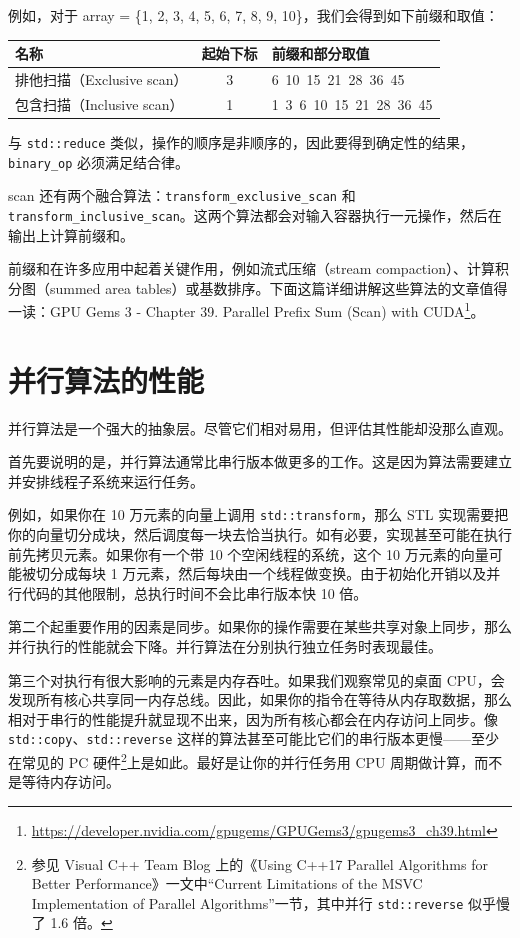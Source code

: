 例如，对于 array = \{1, 2, 3, 4, 5, 6, 7, 8, 9, 10\}，我们会得到如下前缀和取值：

\begin{table}[H]
\centering
\begin{tabularx}{\textwidth}{X c X}
\toprule
名称 & 起始下标 & 前缀和部分取值 \\
\midrule
排他扫描（Exclusive scan） & 3 & 6\ 10\ 15\ 21\ 28\ 36\ 45 \\
包含扫描（Inclusive scan） & 1 & 1\ 3\ 6\ 10\ 15\ 21\ 28\ 36\ 45 \\
\bottomrule
\end{tabularx}
\end{table}

与 \texttt{std::reduce} 类似，操作的顺序是非顺序的，因此要得到确定性的结果，\texttt{binary\_op} 必须满足结合律。

scan 还有两个融合算法：\texttt{transform\_exclusive\_scan} 和 \texttt{transform\_inclusive\_scan}。这两个算法都会对输入容器执行一元操作，然后在输出上计算前缀和。

前缀和在许多应用中起着关键作用，例如流式压缩（stream compaction）、计算积分图（summed area tables）或基数排序。下面这篇详细讲解这些算法的文章值得一读：GPU Gems 3 - Chapter 39. Parallel Prefix Sum (Scan) with CUDA\footnote{\url{https://developer.nvidia.com/gpugems/GPUGems3/gpugems3_ch39.html}}。


\section{并行算法的性能}

并行算法是一个强大的抽象层。尽管它们相对易用，但评估其性能却没那么直观。

首先要说明的是，并行算法通常比串行版本做更多的工作。这是因为算法需要建立并安排线程子系统来运行任务。

例如，如果你在 10 万元素的向量上调用 \texttt{std::transform}，那么 STL 实现需要把你的向量切分成块，然后调度每一块去恰当执行。如有必要，实现甚至可能在执行前先拷贝元素。如果你有一个带 10 个空闲线程的系统，这个 10 万元素的向量可能被切分成每块 1 万元素，然后每块由一个线程做变换。由于初始化开销以及并行代码的其他限制，总执行时间不会比串行版本快 10 倍。

第二个起重要作用的因素是同步。如果你的操作需要在某些共享对象上同步，那么并行执行的性能就会下降。并行算法在分别执行独立任务时表现最佳。

第三个对执行有很大影响的元素是内存吞吐。如果我们观察常见的桌面 CPU，会发现所有核心共享同一内存总线。因此，如果你的指令在等待从内存取数据，那么相对于串行的性能提升就显现不出来，因为所有核心都会在内存访问上同步。像 \texttt{std::copy}、\texttt{std::reverse} 这样的算法甚至可能比它们的串行版本更慢——至少在常见的 PC 硬件\footnote{参见 Visual C++ Team Blog 上的《Using C++17 Parallel Algorithms for Better Performance》一文中“Current Limitations of the MSVC Implementation of Parallel Algorithms”一节，其中并行 \texttt{std::reverse} 似乎慢了 1.6 倍。}上是如此。最好是让你的并行任务用 CPU 周期做计算，而不是等待内存访问。

